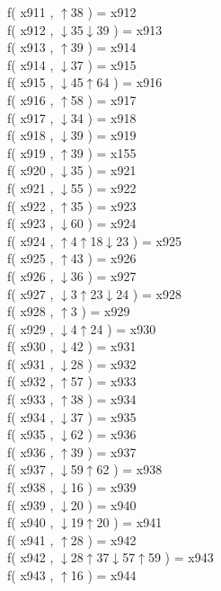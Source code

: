 f( x911 , $\uparrow$38 ) = x912 \\
f( x912 , $\downarrow$35$\downarrow$39 ) = x913 \\
f( x913 , $\uparrow$39 ) = x914 \\
f( x914 , $\downarrow$37 ) = x915 \\
f( x915 , $\downarrow$45$\uparrow$64 ) = x916 \\
f( x916 , $\uparrow$58 ) = x917 \\
f( x917 , $\downarrow$34 ) = x918 \\
f( x918 , $\downarrow$39 ) = x919 \\
f( x919 , $\uparrow$39 ) = x155 \\
f( x920 , $\downarrow$35 ) = x921 \\
f( x921 , $\downarrow$55 ) = x922 \\
f( x922 , $\uparrow$35 ) = x923 \\
f( x923 , $\downarrow$60 ) = x924 \\
f( x924 , $\uparrow$4$\uparrow$18$\downarrow$23 ) = x925 \\
f( x925 , $\uparrow$43 ) = x926 \\
f( x926 , $\downarrow$36 ) = x927 \\
f( x927 , $\downarrow$3$\uparrow$23$\downarrow$24 ) = x928 \\
f( x928 , $\uparrow$3 ) = x929 \\
f( x929 , $\downarrow$4$\uparrow$24 ) = x930 \\
f( x930 , $\downarrow$42 ) = x931 \\
f( x931 , $\downarrow$28 ) = x932 \\
f( x932 , $\uparrow$57 ) = x933 \\
f( x933 , $\uparrow$38 ) = x934 \\
f( x934 , $\downarrow$37 ) = x935 \\
f( x935 , $\downarrow$62 ) = x936 \\
f( x936 , $\uparrow$39 ) = x937 \\
f( x937 , $\downarrow$59$\uparrow$62 ) = x938 \\
f( x938 , $\downarrow$16 ) = x939 \\
f( x939 , $\downarrow$20 ) = x940 \\
f( x940 , $\downarrow$19$\uparrow$20 ) = x941 \\
f( x941 , $\uparrow$28 ) = x942 \\
f( x942 , $\downarrow$28$\uparrow$37$\downarrow$57$\uparrow$59 ) = x943 \\
f( x943 , $\uparrow$16 ) = x944 \\
